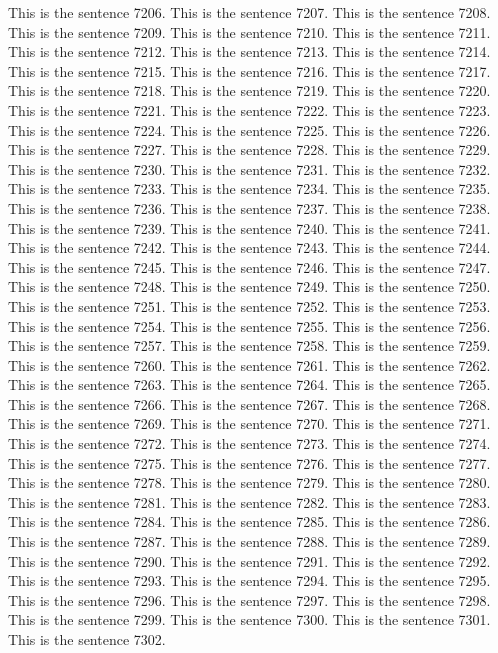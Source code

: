 \documentclass{article}
\begin{document}
This is the sentence 7206.
This is the sentence 7207.
This is the sentence 7208.
This is the sentence 7209.
This is the sentence 7210.
This is the sentence 7211.
This is the sentence 7212.
This is the sentence 7213.
This is the sentence 7214.
This is the sentence 7215.
This is the sentence 7216.
This is the sentence 7217.
This is the sentence 7218.
This is the sentence 7219.
This is the sentence 7220.
This is the sentence 7221.
This is the sentence 7222.
This is the sentence 7223.
This is the sentence 7224.
This is the sentence 7225.
This is the sentence 7226.
This is the sentence 7227.
This is the sentence 7228.
This is the sentence 7229.
This is the sentence 7230.
This is the sentence 7231.
This is the sentence 7232.
This is the sentence 7233.
This is the sentence 7234.
This is the sentence 7235.
This is the sentence 7236.
This is the sentence 7237.
This is the sentence 7238.
This is the sentence 7239.
This is the sentence 7240.
This is the sentence 7241.
This is the sentence 7242.
This is the sentence 7243.
This is the sentence 7244.
This is the sentence 7245.
This is the sentence 7246.
This is the sentence 7247.
This is the sentence 7248.
This is the sentence 7249.
This is the sentence 7250.
This is the sentence 7251.
This is the sentence 7252.
This is the sentence 7253.
This is the sentence 7254.
This is the sentence 7255.
This is the sentence 7256.
This is the sentence 7257.
This is the sentence 7258.
This is the sentence 7259.
This is the sentence 7260.
This is the sentence 7261.
This is the sentence 7262.
This is the sentence 7263.
This is the sentence 7264.
This is the sentence 7265.
This is the sentence 7266.
This is the sentence 7267.
This is the sentence 7268.
This is the sentence 7269.
This is the sentence 7270.
This is the sentence 7271.
This is the sentence 7272.
This is the sentence 7273.
This is the sentence 7274.
This is the sentence 7275.
This is the sentence 7276.
This is the sentence 7277.
This is the sentence 7278.
This is the sentence 7279.
This is the sentence 7280.
This is the sentence 7281.
This is the sentence 7282.
This is the sentence 7283.
This is the sentence 7284.
This is the sentence 7285.
This is the sentence 7286.
This is the sentence 7287.
This is the sentence 7288.
This is the sentence 7289.
This is the sentence 7290.
This is the sentence 7291.
This is the sentence 7292.
This is the sentence 7293.
This is the sentence 7294.
This is the sentence 7295.
This is the sentence 7296.
This is the sentence 7297.
This is the sentence 7298.
This is the sentence 7299.
This is the sentence 7300.
This is the sentence 7301.
This is the sentence 7302.
\end{document}

